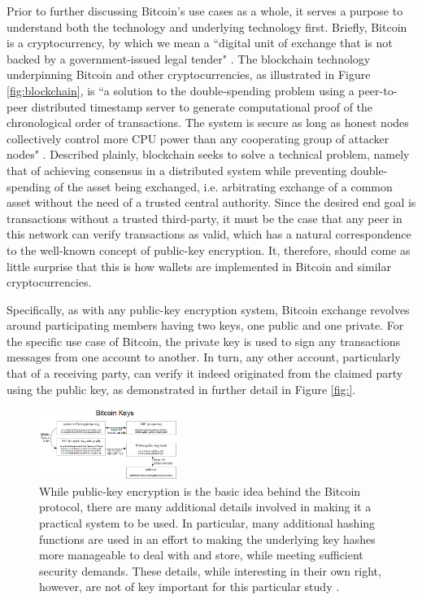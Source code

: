 \documentclass[journal]{IEEEtran}
\begin{document}
Prior to further discussing Bitcoin's use cases as a whole, it serves a purpose to understand both the technology and underlying technology first. Briefly, Bitcoin is a cryptocurrency, by which we mean a ``digital unit of exchange that is not backed by a government-issued legal tender" \cite{virtual}. The blockchain technology underpinning Bitcoin and other cryptocurrencies, as illustrated in Figure \ref{fig:blockchain}, is ``a solution to the double-spending problem using a peer-to-peer distributed timestamp server to generate computational proof of the chronological order of transactions. The system is secure as long as honest nodes collectively control more CPU power than any cooperating group of attacker nodes" \cite{bitcoin}. Described plainly, blockchain seeks to solve a technical problem, namely that of achieving consensus in a distributed system while preventing double-spending of the asset being exchanged, i.e. arbitrating exchange of a common asset without the need of a trusted central authority. Since the desired end goal is transactions without a trusted third-party, it must be the case that any peer in this network can verify transactions as valid, which has a natural correspondence to the well-known concept of public-key encryption. It, therefore, should come as little surprise that this is how wallets are implemented in Bitcoin and similar cryptocurrencies.

Specifically, as with any public-key encryption system, Bitcoin exchange revolves around participating members having two keys, one public and one private. For the specific use case of Bitcoin, the private key is used to sign any transactions messages from one account to another. In turn, any other account, particularly that of a receiving party, can verify it indeed originated from the claimed party using the public key, as demonstrated in further detail in Figure \ref{fig:}.

\begin{figure}
    \label{fig:address}
    \centering
    \includegraphics[width=0.4\textwidth]{address.png}
    \caption{While public-key encryption is the basic idea behind the Bitcoin protocol, there are many additional details involved in making it a practical system to be used. In particular, many additional hashing functions are used in an effort to making the underlying key hashes more manageable to deal with and store, while meeting sufficient security demands. These details, while interesting in their own right, however, are not of key important for this particular study \cite{public-key}.}
\end{figure}
\end{document}

